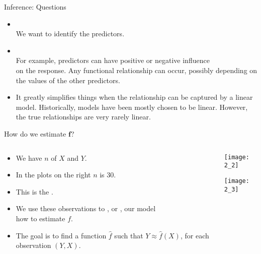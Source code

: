 \documentclass[mathserif, aspectratio=169]{beamer}
\begin{document}
\begin{frame}{Inference: Questions}
	\begin{cpage}
		\begin{itemize}
			\item {}\\
				We want to identify the  predictors.
			\item {}\\
				For example, predictors can have positive or negative influence\\
				on the response. Any functional relationship can occur, 
				possibly depending on the values of the other predictors.
			\item {}
				It greatly simplifies things when the relationship can be captured by a linear model.
				Historically, models have been mostly chosen to be linear. However, the true relationships
				are very rarely linear.
		\end{itemize}
	\end{cpage}
\end{frame}

\begin{frame}{How do we estimate $\bm{f}$?}
	\begin{columns}
		\begin{column}{0.7\textwidth}
			\begin{itemize}
				\item We have $n$  of $X$ and $Y$.
				\item In the plots on the right $n$ is 30.
				\item This is the .
				\item We use these observations to , or , our model\\
					how to estimate $f$.
				\item The goal is to find a function $\hat{f}$ such that $Y \approx \hat{f}(X)$,
					for each observation $(Y, X)$.
			\end{itemize}
		\end{column}
		\begin{column}{0.3\textwidth}
			\begin{center}
				\texttt{[image: 2\_2]}
			\end{center}
			\begin{center}
				\texttt{[image: 2\_3]}
			\end{center}
		\end{column}
	\end{columns}
\end{frame}
\end{document}
